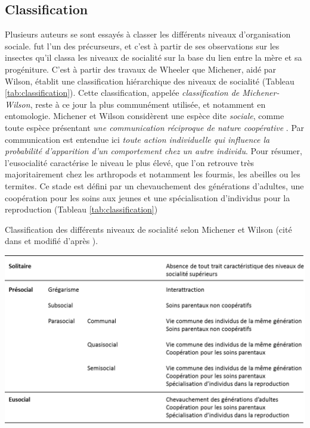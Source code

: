 
    \subsection{Classification}
    \label{subsec:classification}
Plusieurs auteurs se sont essayés à classer les différents niveaux d'organisation sociale. \citet{wheeler_social_1928} fut l'un des précurseurs, et c'est à partir de ses observations sur les insectes qu'il classa les niveaux de socialité sur la base du lien entre la mère et sa progéniture. C'est à partir des travaux de Wheeler que Michener, aidé par Wilson, établit une classification hiérarchique des niveaux de socialité (Tableau \ref{tab:classification}). Cette classification, appelée \textit{classification de Michener-Wilson}, reste à ce jour la plus communément utilisée, et notamment en entomologie. Michener et Wilson considèrent une espèce dite \textit{sociale}, comme toute espèce présentant \textit{une communication réciproque de nature coopérative} \citep{michener_social_1974, wilson_insect_1971}. Par communication est entendue ici \textit{toute action individuelle qui influence la probabilité d'apparition d'un comportement chez un autre individu}. Pour résumer, l'eusocialité caractérise le niveau le plus élevé, que l'on retrouve très majoritairement chez les arthropods et notamment les fourmis, les abeilles ou les termites. Ce stade est défini par un chevauchement des générations d'adultes, une coopération pour les soins aux jeunes et une spécialisation d'individus pour la reproduction (Tableau \ref{tab:classification})


\begin{table}[p]
	\caption[Classification]{Classification des différents niveaux de socialité selon Michener et Wilson (cité dans \citet{lihoreau_organisation_2009} et modifié d'après \citet{aron_les_2009}).}
    \centering
	\includegraphics[width=1 \textwidth]{Figures/classification.png}
		\label{tab:classification}
\end{table}   

